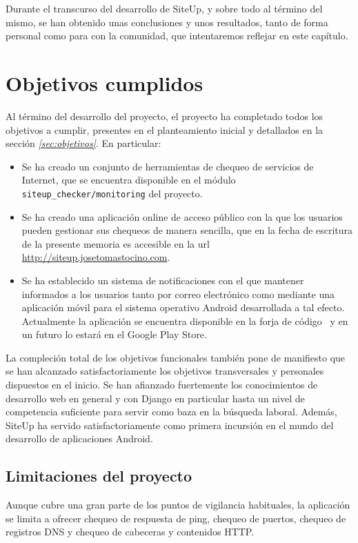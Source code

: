 Durante el transcurso del desarrollo de SiteUp, y sobre todo al término del
mismo, se han obtenido unas conclusiones y unos resultados, tanto de forma
personal como para con la comunidad, que intentaremos reflejar en este capítulo.


\section{Objetivos cumplidos}
Al término del desarrollo del proyecto, el proyecto ha completado todos los
objetivos a cumplir, presentes en el planteamiento inicial y detallados en la
sección \textit{\ref{sec:objetivos}}. En particular:

\begin{itemize}
\item Se ha creado un conjunto de herramientas de chequeo de servicios de
  Internet, que se encuentra disponible en el módulo
  \texttt{siteup\_checker/monitoring} del proyecto.
\item Se ha creado una aplicación online de acceso público con la que los
  usuarios pueden gestionar sus chequeos de manera sencilla, que en la fecha de
  escritura de la presente memoria es accesible en la url
  \url{http://siteup.josetomastocino.com}.
\item Se ha establecido un sistema de notificaciones con el que mantener
  informados a los usuarios tanto por correo electrónico como mediante una
  aplicación móvil para el sistema operativo Android desarrollada a tal
  efecto. Actualmente la aplicación se encuentra disponible en la forja de
  código~\cite{forja} y en un futuro lo estará en el Google Play Store.
\end{itemize}

La compleción total de los objetivos funcionales también pone de manifiesto que
se han alcanzado satisfactoriamente los objetivos transversales y personales
dispuestos en el inicio. Se han afianzado fuertemente los conocimientos de
desarrollo web en general y con Django en particular hasta un nivel de
competencia suficiente para servir como baza en la búsqueda laboral. Además,
SiteUp ha servido satisfactoriamente como primera incursión en el mundo del
desarrollo de aplicaciones Android.

\subsection{Limitaciones del proyecto}
Aunque cubre una gran parte de los puntos de vigilancia habituales, la
aplicación se limita a ofrecer chequeo de respuesta de ping, chequeo de puertos,
chequeo de registros DNS y chequeo de cabeceras y contenidos HTTP.

